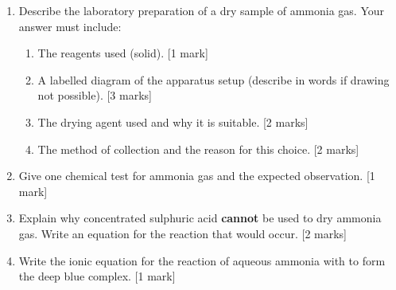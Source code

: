 \documentclass[11pt]{article}
\begin{document}
\begin{exercice}
\begin{enumerate}
\item Describe the laboratory preparation of a dry sample of ammonia gas. Your answer must include:
      \begin{enumerate}[label=(\alph*)]
      \item The reagents used (solid). [1 mark]
      \item A labelled diagram of the apparatus setup (describe in words if drawing not possible). [3 marks]
      \item The drying agent used and why it is suitable. [2 marks]
      \item The method of collection and the reason for this choice. [2 marks]
      \end{enumerate}
\item Give one chemical test for ammonia gas and the expected observation. [1 mark]
\item Explain why concentrated sulphuric acid \textbf{cannot} be used to dry ammonia gas. Write an equation for the reaction that would occur. [2 marks]
\item Write the ionic equation for the reaction of aqueous ammonia with  to form the deep blue complex. [1 mark]
\end{enumerate}
\end{exercice}
\end{document}
